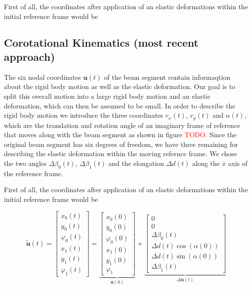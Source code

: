 First of all, the coordinates after application of an elastic deformations within the initial reference frame would be






\newpage
\subsection{Corotational Kinematics (most recent approach)}

The six nodal coordinates $\boldsymbol{u}(t)$ of the beam segment contain informaqtion about the rigid body motion as well as the elastic deformation.
Our goal is to split this overall motion into a large rigid body motion and an elastic deformation, which can then be assumed to be small.
In order to describe the rigid body motion we introduce the three coordinates $r_x(t)$, $r_y(t)$ and $\alpha(t)$, which are the translation and rotation angle of an imaginary frame of reference that moves along with the beam segment as shown in figure \textcolor{red}{TODO}.
Since the original beam segment has six degrees of freedom, we have three remaining for describing the elastic deformation within the moving refernce frame.
We chose the two angles $\Delta\beta_0(t)$, $\Delta\beta_1(t)$ and the elongation $\Delta d(t)$ along the $\overline{x}$ axis of the reference frame.

First of all, the coordinates after application of an elastic deformations within the initial reference frame would be

\begin{equation}
\renewcommand\arraystretch{1.5}
\tilde{\boldsymbol{u}}(t)
=
\begin{bmatrix}
x_0(t) \\
y_0(t) \\
\varphi_0(t) \\
x_1(t) \\
y_1(t) \\
\varphi_1(t)
\end{bmatrix}
=
\underbrace{
\begin{bmatrix}
x_0(0) \\
y_0(0) \\
\varphi_0(0) \\
x_1(0) \\
y_1(0) \\
\varphi_1
\end{bmatrix}
}_{\boldsymbol{u}(0)}
+
\underbrace{
\begin{bmatrix}
0 \\
0 \\
\Delta\beta_0(t) \\
\Delta d(t) \cos(\alpha(0)) \\
\Delta d(t) \sin(\alpha(0)) \\
\Delta \beta_1(t)
\end{bmatrix}
}_{\Delta\boldsymbol{u}(t)}
\end{equation}

